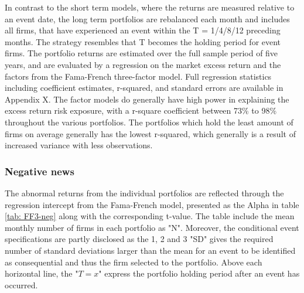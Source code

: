 In contrast to the short term models, where the returns are measured relative to an event date, the long term portfolios are rebalanced each month and includes all firms, that have experienced an event within the T = 1/4/8/12 preceding months. The strategy resembles that T becomes the holding period for event firms. The portfolio returns are estimated over the full sample period of five years, and are evaluated by a regression on the market excess return and the factors from the Fama-French \citeyear{Fama_french_3fac} three-factor model. Full regression statistics including coefficient estimates, r-squared, and standard errors are available in Appendix X. The factor models do generally have high power in explaining the excess return risk exposure, with a r-square coefficient between 73\% to 98\% throughout the various portfolios. The portfolios which hold the least amount of firms on average generally has the lowest r-squared, which generally is a result of increased variance with less observations.  


\subsubsection{Negative news}

The abnormal returns from the individual portfolios are reflected through the regression intercept from the Fama-French model, presented as the Alpha in table \ref{tab: FF3-neg} along with the corresponding t-value. The table include the mean monthly number of firms in each portfolio as "N". Moreover, the conditional event specifications are partly disclosed as the 1, 2 and 3 "SD" gives the required number of standard deviations larger than the mean for an event to be identified as consequential and thus the firm selected to the portfolio. Above each horizontal line, the "$T = x$" express the portfolio holding period after an event has occurred. 

